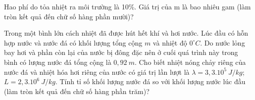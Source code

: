 \begin{ex}
	Hao phí do tỏa nhiệt ra môi trường là 10\%. Giá trị của m là bao nhiêu gam (làm tròn kết quả đến chữ số hàng phần mười)?
\end{ex}
\begin{ex}%
	Trong một bình lớn cách nhiệt đã được hút hết khí và hơi nước. Lúc đầu có hỗn hợp nước và nước đá có khối lượng tổng cộng $m$ và nhiệt độ $0^\circ C$. Do nước lỏng bay hơi và phần còn lại của nước bị đông đặc nên ở cuối quá trình này trong bình có lượng nước đá tổng cộng là $0,92\ m$. Cho biết nhiệt nóng chảy riêng của nước đá và nhiệt hóa hơi riêng của nước có giá trị lần lượt là $\lambda = 3,3.10^5\ J/kg$; $L = 2,3.10^6\ J/kg$. Tính tỉ số khối lượng nước đá so với khối lượng nước lúc đầu (làm tròn kết quả đến chữ số hàng phần trăm)?
	
\end{ex}

